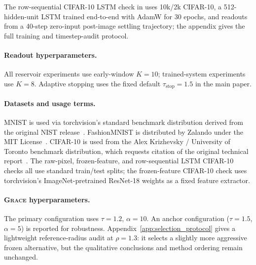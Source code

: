 \documentclass{article}
\theoremstyle{remark}
\newcommand{\grace}{\textnormal{\textsc{Grace}}}
\begin{document}
The row-sequential CIFAR-10 LSTM check in  uses 10k/2k
CIFAR-10, a 512-hidden-unit LSTM trained end-to-end with AdamW for 30 epochs,
and readouts from a 40-step zero-input post-image settling trajectory; the
appendix gives the full training and timestep-audit protocol.

\paragraph{Readout hyperparameters.}
All reservoir experiments use early-window $K=10$; trained-system
experiments use $K=8$. Adaptive stopping uses the fixed default
$\tau_{\text{stop}} = 1.5$ in the main paper.

\paragraph{Datasets and usage terms.}
MNIST is used via torchvision's standard benchmark distribution derived from
the original NIST release~\citep{lecun1998gradient}. FashionMNIST is
distributed by Zalando under the MIT License~\citep{xiao2017fashion}.
CIFAR-10 is used from the Alex Krizhevsky / University of Toronto benchmark
distribution, which requests citation of the original technical
report~\citep{krizhevsky2009learning}. The raw-pixel, frozen-feature, and
row-sequential LSTM CIFAR-10 checks all use standard train/test splits; the
frozen-feature CIFAR-10 check uses torchvision's ImageNet-pretrained ResNet-18
weights as a fixed feature extractor.

\paragraph{\grace{} hyperparameters.}
The primary configuration uses $\tau = 1.2$, $\alpha = 10$. An anchor
configuration ($\tau = 1.5$, $\alpha = 5$) is reported for robustness.
Appendix~\ref{app:selection_protocol} gives a lightweight reference-radius
audit at $\rho = 1.3$: it selects a slightly more aggressive frozen
alternative, but the qualitative conclusions and method ordering remain
unchanged.
\end{document}
